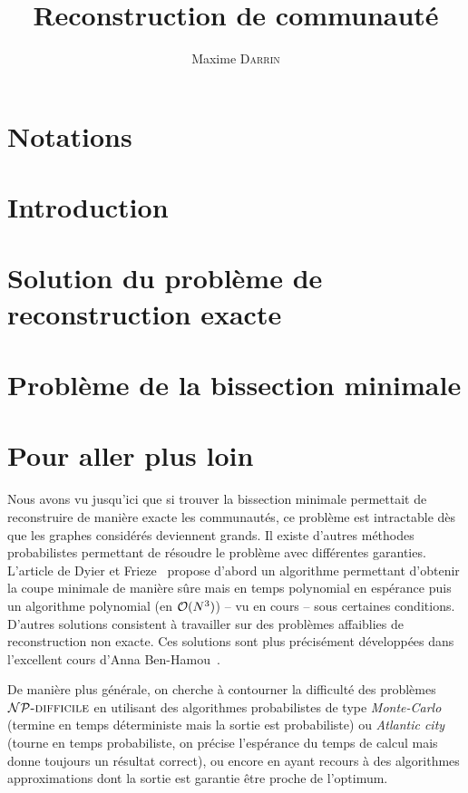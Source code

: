 \documentclass[fleqn,11pt, titlepage, french]{article}
\title{Reconstruction de communauté}
\author{Maxime \textsc{Darrin}}
\begin{document}
	\maketitle
	\tableofcontents

	\newpage
	
	\section*{Notations}
	
	
	
	\newpage
	\section{Introduction}
	
	
	\section{Solution du problème de reconstruction exacte}
	
	
	
	\section{Problème de la bissection minimale}
	
	
	
	\section{Pour aller plus loin}
	
	Nous avons vu jusqu'ici que si trouver la bissection minimale permettait de reconstruire de manière exacte les communautés, ce problème est intractable dès que les graphes considérés deviennent grands. Il existe d'autres méthodes probabilistes permettant de résoudre le problème avec différentes garanties. L'article de Dyier et Frieze~\cite{dyier} propose d'abord un algorithme permettant d'obtenir la coupe minimale de manière sûre mais en temps polynomial en espérance puis un algorithme polynomial (en $\mathcal O(N^3)$) -- vu en cours --  sous certaines conditions. D'autres solutions consistent à travailler sur des problèmes affaiblies de reconstruction non exacte. Ces solutions sont plus précisément développées dans l'excellent cours d'Anna Ben-Hamou~\cite{ig}.
	
	De manière plus générale, on cherche à contourner la difficulté des problèmes $\mathcal{NP}\text{\textsc{-difficile}}$ en utilisant des algorithmes probabilistes de type \emph{Monte-Carlo} (termine en temps déterministe mais la sortie est probabiliste) ou \emph{Atlantic city} (tourne en temps probabiliste, on précise l'espérance du temps de calcul mais donne toujours un résultat correct), ou encore en ayant recours à des algorithmes approximations dont la sortie est garantie être proche de l'optimum.
	
\end{document}
